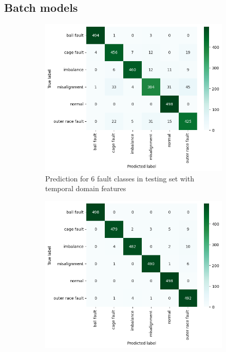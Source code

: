 \subsection{Batch models}


\begin{figure}[ht]
    \centering
    \begin{subfigure}[b]{0.49\textwidth}
        \includegraphics[width=\textwidth]{assets/design/kNN-temporal-confusion-matrix-fault.png}
        \caption{Prediction for 6 fault classes in testing set with temporal domain features}
    \end{subfigure}
    \hfill
    \begin{subfigure}[b]{0.49\textwidth}
        \includegraphics[width=\textwidth]{assets/design/kNN-spectral-confusion-matrix-fault.png}

\end{subfigure}
\end{figure}
